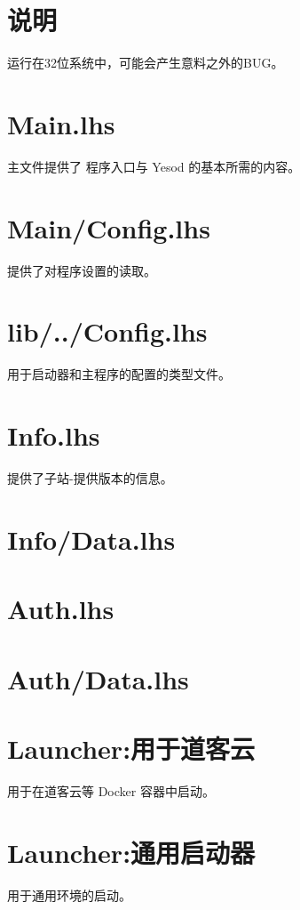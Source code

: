 










  \maketitle
  \newpage
  \tableofcontents
  \newpage

  \section{说明}
  运行在32位系统中，可能会产生意料之外的BUG。

  \section[程序主文件 Main.lhs文件]{Main.lhs}
  主文件提供了 程序入口与 Yesod 的基本所需的内容。
  

  \section[设置载入文件 Main/Config.lhs文件]{Main/Config.lhs}
  提供了对程序设置的读取。
  

  \section[共用的配置文件 lib/Yrarbil/Backend/Config.lhs]{lib/../Config.lhs}
  用于启动器和主程序的配置的类型文件。
  

  \section[子站-提供版本信息 Info.lhs文件]{Info.lhs}
  提供了子站-提供版本的信息。
  

  \section[辅助Info.lhs文件]{Info/Data.lhs}
  

  \section[认证]{Auth.lhs}
  

  \section[辅助Auth.lhs]{Auth/Data.lhs}
  

  \section{Launcher:用于道客云}
  用于在道客云等 Docker 容器中启动。
  
  \section{Launcher:通用启动器}
  用于通用环境的启动。
  


